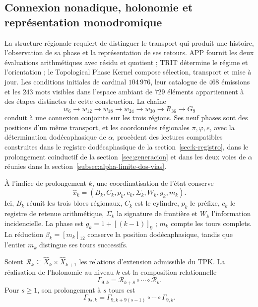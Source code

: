 \subsection{Connexion nonadique, holonomie et représentation monodromique}
\label{mono-ampl:conexion}

La structure régionale requiert de distinguer le transport qui produit une
histoire, l'observation de sa phase et la représentation de ses retours.
APP fournit les deux évaluations arithmétiques avec résidu et quotient ; TRIT
détermine le régime et l'orientation ; le Topological Phase Kernel compose
sélection, transport et mise à jour. Les conditions initiales de
cardinal \(104\,976\), leur catalogue de \(468\) émissions et les \(243\)
mots visibles dans l'espace ambiant de \(729\) éléments appartiennent à des étapes
distinctes de cette construction. La chaîne
\[
 w_6\longrightarrow w_{12}\longrightarrow w_{18}
 \longrightarrow w_{24}\longrightarrow w_{30}
 \longrightarrow R_{36}\longrightarrow G_9
\]
conduit à une connexion conjointe sur les trois régions. Ses neuf phases
sont des positions d'un même transport, et les coordonnées régionales
\(\pi,\varphi,e\), avec la détermination dodécaphasique de \(\alpha\),
procèdent des lectures compatibles construites dans le registre dodécaphasique
de la section~\ref{sec:k-registro}, dans le prolongement coinductif de la
section~\ref{sec:generacion} et dans les deux voies de \(\alpha\) réunies dans la
section~\ref{subsec:alpha-limite-dos-vias}.

À l'indice de prolongement \(k\), une coordinatisation de l'état conserve
\[
 \widehat x_k=(B_k,C_k,p_k,c_k,\Sigma_k,W_k,g_k,m_k).
\]
Ici, \(B_k\) réunit les trois blocs régionaux, \(C_k\) est le cylindre,
\(p_k\) le préfixe, \(c_k\) le registre de retenue arithmétique, \(\Sigma_k\) la signature
de frontière et \(W_k\) l'information incidencielle. La phase est
\(g_k=1+[(k-1)]_9\) ; \(m_k\) compte les tours complets. La réduction
\(\beta_k=[m_k]_{12}\) conserve la position dodécaphasique, tandis que
l'entier \(m_k\) distingue ses tours successifs.

\begin{definition}
\label{mono-ampl:def-vuelta}
Soient \(\mathcal R_k\subseteq\widehat X_k\times\widehat X_{k+1}\)
les relations d'extension admissible du TPK. La réalisation de
l'holonomie au niveau \(k\) est la composition relationnelle
\[
 \Gamma_{9,k}=\mathcal R_{k+8}\circ\cdots\circ\mathcal R_k.
\]
Pour \(s\geq1\), son prolongement à \(s\) tours est
\[
 \Gamma_{9s,k}=
 \Gamma_{9,k+9(s-1)}\circ\cdots\circ\Gamma_{9,k}.
\]
\end{definition}

